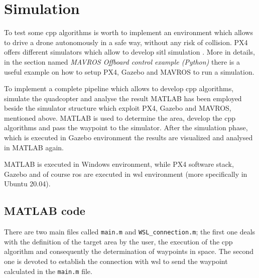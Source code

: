 \section{Simulation}
To test some \ac{cpp} algorithms is worth to implement an environment which allows to drive a drone autonomously in a safe way, without any risk of collision. PX4 offers different simulators which allow to develop \ac{sitl} simulation \cite{px4_simulation}. More in details, in the section named \textit{MAVROS Offboard control example (Python)} \cite{px4_ros_mavros} there is a useful example on how to setup PX4, Gazebo and MAVROS to run a simulation.

To implement a complete pipeline which allows to develop \ac{cpp} algorithms, simulate the quadcopter and analyse the result MATLAB has been employed beside the simulator structure which exploit PX4, Gazebo and MAVROS, mentioned above. MATLAB is used to determine the area, develop the \ac{cpp} algorithms and pass the waypoint to the simulator. After the simulation phase, which is executed in Gazebo environment the results are visualized and analysed in MATLAB again.

MATLAB is executed in Windows environment, while PX4 software stack, Gazebo and of course \ac{ros} are executed in \ac{wsl} environment (more specifically in Ubuntu 20.04).

\subsection{MATLAB code} 
There are two main files called \texttt{main.m} and \texttt{WSL\_connection.m}; the first one deals with the definition of the target area by the user, the execution of the \ac{cpp} algorithm and consequently the determination of waypoints in space. The second one is devoted to establish the connection with \ac{wsl} to send the waypoint calculated in the \texttt{main.m} file.
